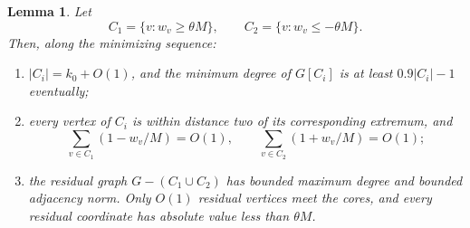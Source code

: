 \documentclass[11pt,a4paper]{article}
\numberwithin{equation}{section}
\newtheorem{lemma}[theorem]{Lemma}
\theoremstyle{definition}
\theoremstyle{remark}
\begin{document}
\begin{lemma}\label{graph:cores}
Let
\[
 C_1=\{v:w_v\ge\theta M\},\qquad
 C_2=\{v:w_v\le-\theta M\}.
\]
Then, along the minimizing sequence:
\begin{enumerate}
\item $|C_i|=k_0+O(1)$, and the minimum degree of $G[C_i]$ is at least
$0.9|C_i|-1$ eventually;
\item every vertex of $C_i$ is within distance two of its corresponding
extremum, and
\begin{equation}\label{graph:core-deficits}
 \sum_{v\in C_1}(1-w_v/M)=O(1),\qquad
 \sum_{v\in C_2}(1+w_v/M)=O(1);
\end{equation}
\item the residual graph $G-(C_1\cup C_2)$ has bounded maximum degree
and bounded adjacency norm. Only $O(1)$ residual vertices meet the cores,
and every residual coordinate has absolute value less than $\theta M$.
\end{enumerate}
\end{lemma}
\end{document}
